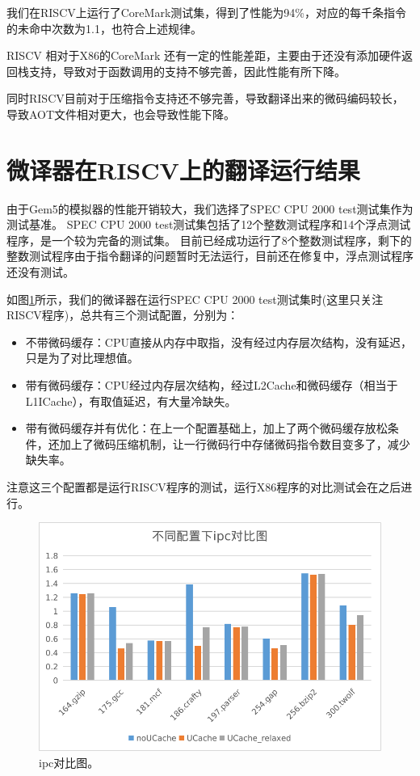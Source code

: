 我们在RISCV上运行了CoreMark测试集，得到了性能为94\%，对应的每千条指令的未命中次数为1.1，也符合上述规律。

RISCV 相对于X86的CoreMark 还有一定的性能差距，主要由于还没有添加硬件返回栈支持，导致对于函数调用的支持不够完善，因此性能有所下降。

同时RISCV目前对于压缩指令支持还不够完善，导致翻译出来的微码编码较长，导致AOT文件相对更大，也会导致性能下降。


\section{微译器在RISCV上的翻译运行结果}
由于Gem5的模拟器的性能开销较大，我们选择了SPEC CPU 2000 test测试集作为测试基准。
SPEC CPU 2000 test测试集包括了12个整数测试程序和14个浮点测试程序，是一个较为完备的测试集。
目前已经成功运行了8个整数测试程序，剩下的整数测试程序由于指令翻译的问题暂时无法运行，目前还在修复中，浮点测试程序还没有测试。

如图\ref{img:ipc}所示，我们的微译器在运行SPEC CPU 2000 test测试集时(这里只关注RISCV程序)，总共有三个测试配置，分别为：
\begin{itemize}
  \item 不带微码缓存：CPU直接从内存中取指，没有经过内存层次结构，没有延迟，只是为了对比理想值。
  \item 带有微码缓存：CPU经过内存层次结构，经过L2Cache和微码缓存（相当于L1ICache），有取值延迟，有大量冷缺失。
  \item 带有微码缓存并有优化：在上一个配置基础上，加上了两个微码缓存放松条件，还加上了微码压缩机制，让一行微码行中存储微码指令数目变多了，减少缺失率。
\end{itemize}
注意这三个配置都是运行RISCV程序的测试，运行X86程序的对比测试会在之后进行。

\begin{figure}[h]
  \centering
  \includegraphics[width=0.8\linewidth]{./plot/ipc.png}
  \caption{ipc对比图。}
  \label{img:ipc}
\end{figure}

